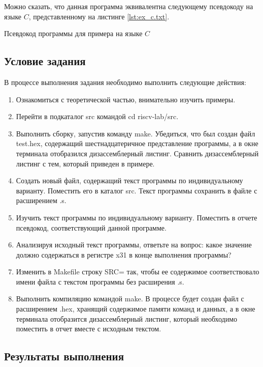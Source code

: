 \clearpage

Можно сказать, что данная программа эквивалентна следующему псевдокоду на языке $C$, представленному на листинге \ref{lst:ex_c.txt}.

 {Псевдокод программы для примера на языке $C$}

\clearpage

\subsection*{Условие задания}

В процессе выполнения задания необходимо выполнить следующие действия:

\begin{enumerate}[label=\arabic*)]
	\item Ознакомиться с теоретической частью, внимательно изучить примеры.
	\item Перейти в подкаталог src командой cd riscv-lab/src.
	\item Выполнить сборку, запустив команду make. Убедиться, что был создан файл test.hex,
	содержащий шестнадцатеричное представление программы, а в окне терминала отобразился
	дизассемблерный листинг. Сравнить дизассемблерный листинг с тем, который приведен в примере.
	\item Создать новый файл, содержащий текст программы по индивидуальному варианту. Поместить его
	в каталог src. Текст программы сохранить в файле с расширением .s.
	\item Изучить текст программы по индивидуальному варианту. Поместить в отчете псевдокод,
	соответствующий данной программе.
	\item Анализируя исходный текст программы, ответьте на вопрос: какое значение должно
	содержаться в регистре x31 в конце выполнения программы?
	\item Изменить в Makefile строку SRC= так, чтобы ее содержимое соответствовало
	имени файла с текстом программы без расширения .s.
	\item Выполнить компиляцию командой make. В процессе будет создан файл с расширением .hex,
	хранящий содержимое памяти команд и данных, а в окне терминала отобразится дизассемблерный листинг, который необходимо поместить в отчет вместе с исходным текстом.
\end{enumerate}

\clearpage

\subsection*{Результаты выполнения}

